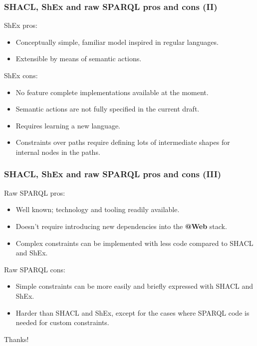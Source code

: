 \documentclass{beamer}
\makeatletter
\newcommand{\atweb}{\textbf{@Web}\xspace}
\makeatother
\begin{document}
\begin{frame}
  \frametitle{SHACL, ShEx and raw SPARQL pros and cons (II)}

  ShEx pros:

  \begin{itemize}
    \item Conceptually simple, familiar model inspired in regular languages.
    \item Extensible by means of semantic actions.
  \end{itemize}

  ShEx cons:

  \begin{itemize}
    \item No feature complete implementations available at the moment.
    \item Semantic actions are not fully specified in the current draft.
    \item Requires learning a new language.
    \item Constraints over paths require defining lots of intermediate shapes
      for internal nodes in the paths.
  \end{itemize}
\end{frame}

\begin{frame}
  \frametitle{SHACL, ShEx and raw SPARQL pros and cons (III)}

  Raw SPARQL pros:

  \begin{itemize}
    \item Well known; technology and tooling readily available.
    \item Doesn't require introducing new dependencies into the \atweb stack.
    \item Complex constraints can be implemented with less code compared to
      SHACL and ShEx.
  \end{itemize}

  Raw SPARQL cons:

  \begin{itemize}
    \item Simple constraints can be more easily and briefly expressed with SHACL
      and ShEx.
    \item Harder than SHACL and ShEx, except for the cases where SPARQL code
      is needed for custom constraints.
  \end{itemize}
\end{frame}

\begin{frame}
  \begin{center}
    \Huge{Thanks!}
  \end{center}
\end{frame}
\end{document}

